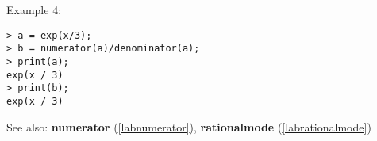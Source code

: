 \noindent Example 4: 
\begin{center}\begin{minipage}{15cm}\begin{Verbatim}[frame=single]
> a = exp(x/3);
> b = numerator(a)/denominator(a);
> print(a);
exp(x / 3)
> print(b);
exp(x / 3)
\end{Verbatim}
\end{minipage}\end{center}
See also: \textbf{numerator} (\ref{labnumerator}), \textbf{rationalmode} (\ref{labrationalmode})
